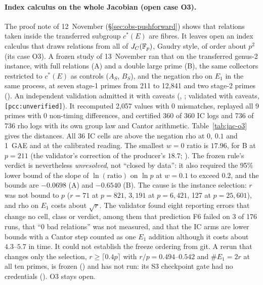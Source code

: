 \paragraph{Index calculus on the whole Jacobian (open case O3).} The proof
note of 12~November (\S\ref{sec:obs-pushforward}) shows that relations
taken inside the transferred subgroup $c^*(E)$ are fibres. It leaves open
an index calculus that draws relations from all of $J_C(\mathbb{F}_p)$, Gaudry
style, of order about $p^2$ (its case O3). A frozen study of 13~November
ran that on the transferred genus-2 instance, with full relations (A) and
a double large prime (B), the same collectors restricted to $c^*(E)$ as
controls ($A_S$, $B_S$), and the negation rho on $E_1$ in the same process,
at seven stage-1 primes from 211 to 12{,}841 and two stage-2 primes
(). An independent
validation admitted it with caveats
(,
; validated with
caveats, \texttt{[pcc:unverified]}). It recomputed 2{,}057 values with 0
mismatches, replayed all 9 primes with 0 non-timing differences, and
certified 360 of 360 IC logs and 736 of 736 rho logs with its own group law
and Cantor arithmetic. Table~\ref{tab:jac-o3} gives the distances. All 36
IC cells are above the negation rho at 0, $0.1$ and 1~GAE and at the
calibrated reading. The smallest $w=0$ ratio is $17.96$, for B at $p=211$
(the validator's correction of the producer's $18.7$;
). The frozen rule's
verdict is nevertheless \emph{unresolved}, not ``closed by data'': it also
required the 95\% lower bound of the slope of $\ln(\text{ratio})$ on $\ln p$
at $w=0.1$ to exceed $0.2$, and the bounds are $-0.0698$ (A) and $-0.6540$
(B). The cause is the instance selection: $r$ was not bound to $p$ ($r=71$
at $p=821$, $3{,}191$ at $p=6{,}421$, 127 at $p=25{,}601$), and rho on $E_1$
costs about $\sqrt r$. The validator found eight reporting errors that
change no cell, class or verdict, among them that prediction F6 failed on 3
of 176 runs, that ``0 bad relations'' was not measured, and that the IC arms
are lower bounds with a Cantor step counted as one $E_1$ addition although
it costs about $4.3$--$5.7$ in time. It could not establish the freeze
ordering from git. A rerun that changes only the selection,
$r\ge\lceil0.4p\rceil$ with $r/p=0.494$--$0.542$ and $\#E_1=2r$ at all ten
primes, is frozen
() and has not run:
its S3 checkpoint gate had no credentials
(). O3 stays open.


